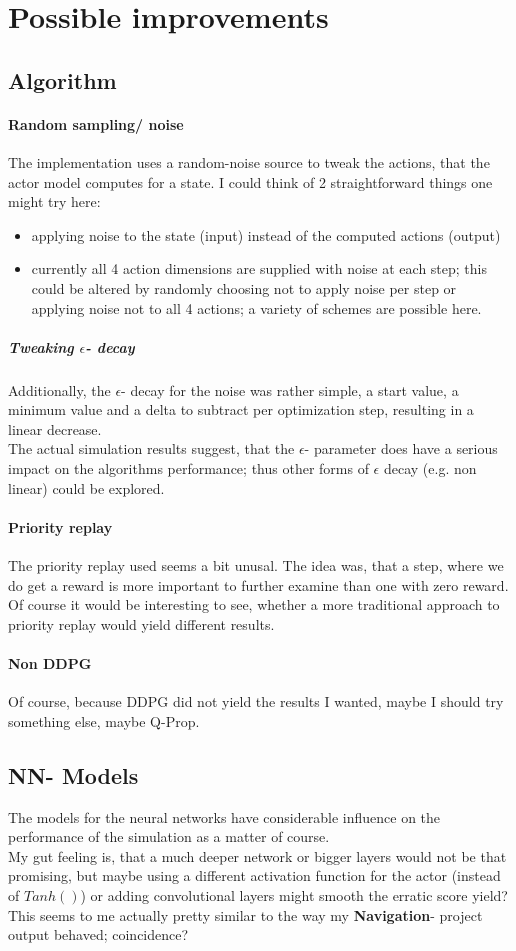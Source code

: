 \documentclass[a4paper]{article}
\begin{document}
\section{Possible improvements}
\subsection{Algorithm}
\paragraph{Random sampling/ noise}
The implementation uses a random-noise source to tweak the actions, that the
actor model computes for a state. I could think of 2 straightforward things one might try here:
\begin{itemize}
\item applying noise to the state (input) instead of the computed actions (output)
\item currently all 4 action dimensions are supplied with noise at each step;
this could be altered by randomly choosing not to apply noise per step or
applying noise not to all 4 actions; a variety of schemes are possible here.
\end{itemize}

\subparagraph{Tweaking $\epsilon$- decay}
Additionally, the $\epsilon$- decay for the noise was rather simple, a start value,
a minimum value and a delta to subtract per optimization step,
resulting in a linear decrease.
\\
The actual simulation results suggest, that the $\epsilon$- parameter
does have a serious impact on the algorithms performance;
thus other forms of $\epsilon$ decay (e.g. non linear) could be explored.

\paragraph{Priority replay}
The priority replay used seems a bit unusal. The idea was, that a step, where
we do get a reward is more important to further examine than one with zero
reward.
\\
Of course it would be interesting to see, whether a more traditional approach
to priority replay would yield different results.

\paragraph{Non DDPG}
Of course, because DDPG did not yield the results I wanted, maybe I should
try something else, maybe Q-Prop.

\subsection{NN- Models}
The models for the neural networks have considerable influence on the
performance of the simulation as a matter of course.
\\
My gut feeling is, that a much deeper network or bigger layers
would not be that promising, but maybe using a different activation function
for the actor (instead of $Tanh()$) or adding convolutional layers might smooth
the erratic score yield? This seems to me actually pretty similar to the
way my \textbf{Navigation}- project output behaved; coincidence?
\end{document}
